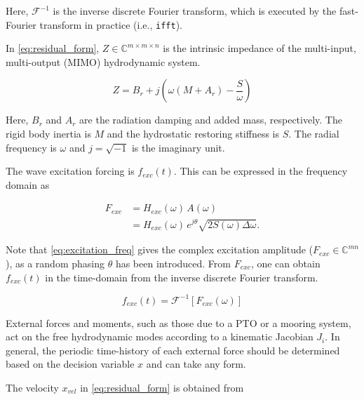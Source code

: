 \documentclass[]{article}
\begin{document}
\noindent{}Here, $\mathcal{F}^{-1}$ is the inverse discrete Fourier transform, which is executed by the fast-Fourier transform in practice (i.e., \texttt{ifft}).

In \eqref{eq:residual_form}, $Z\in \mathbb{C}^{m\times{}m\times{}n}$ is the intrinsic impedance of the multi-input, multi-output (MIMO) hydrodynamic system.

\begin{equation}
	Z = B_r + j\left( \omega\left(  M + A_r \right) -\frac{S}{\omega} \right)
\end{equation}

\noindent{}Here, $B_r$ and $A_r$ are the radiation damping and added mass, respectively.
The rigid body inertia is $M$ and the hydrostatic restoring stiffness is $S$.
The radial frequency is $\omega$ and $j=\sqrt{-1}$ is the imaginary unit.

The wave excitation forcing is $f_{exc}(t)$.
This can be expressed in the frequency domain as

\begin{equation}\label{eq:excitation_freq}
	\begin{aligned}
		F_{exc} &= H_{exc}(\omega) \, A(\omega) \\
		&= H_{exc} (\omega) \, e^{j \theta} \sqrt{2 S(\omega) \Delta \omega}.
	\end{aligned}
\end{equation}

\noindent{}Note that \eqref{eq:excitation_freq} gives the complex excitation amplitude ($F_{exc} \in \mathbb{C}^{mn}$), as a random phasing $\theta$ has been introduced.
From $F_{exc}$, one can obtain $f_{exc}(t)$ in the time-domain from the inverse discrete Fourier transform.

\begin{equation}
	f_{exc}(t) = \mathcal{F}^{-1} \left[ F_{exc}(\omega) \right]
\end{equation}

External forces and moments, such as those due to a PTO or a mooring system, act on the free hydrodynamic modes according to a kinematic Jacobian $J_i$.
In general, the periodic time-history of each external force should be determined based on the decision variable $x$ and can take any form.


The velocity $x_{vel}$ in \eqref{eq:residual_form} is obtained from
\end{document}
